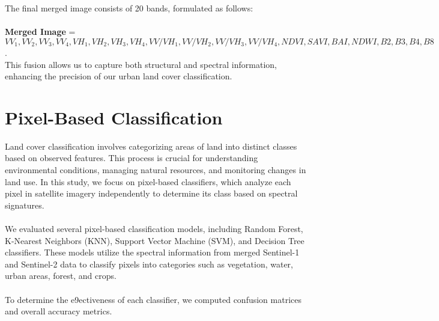 \documentclass[usenatbib]{tjaa}
\begin{document}
\\
\\
The ﬁnal merged image consists of 20 bands, formulated as follows:
\\
\\
\textbf{Merged Image} = \[VV_1, VV_2, VV_3, VV_4, VH_1, VH_2, VH_3, VH_4, VV/VH_1, VV/VH_2,
VV/VH_3, VV/VH_4, NDVI, SAVI, BAI, NDWI, B2, B3, B4, B8\].
\\
This fusion allows us to capture both structural and spectral information, enhancing the
precision of our urban land cover classiﬁcation.

\section{Pixel-Based Classification}
Land cover classiﬁcation involves categorizing areas of land into distinct classes based on
observed features. This process is crucial for understanding environmental conditions,
managing natural resources, and monitoring changes in land use. In this study, we focus
on pixel-based classiﬁers, which analyze each pixel in satellite imagery independently to
determine its class based on spectral signatures.
\\
\\
We evaluated several pixel-based classiﬁcation models, including Random Forest, K-Nearest
Neighbors (KNN), Support Vector Machine (SVM), and Decision Tree classiﬁers. These
models utilize the spectral information from merged Sentinel-1 and Sentinel-2 data to classify
pixels into categories such as vegetation, water, urban areas, forest, and crops.
\\
\\
To determine the e9ectiveness of each classiﬁer, we computed confusion matrices and overall
accuracy metrics.






\label{lastpage}
\end{document}
